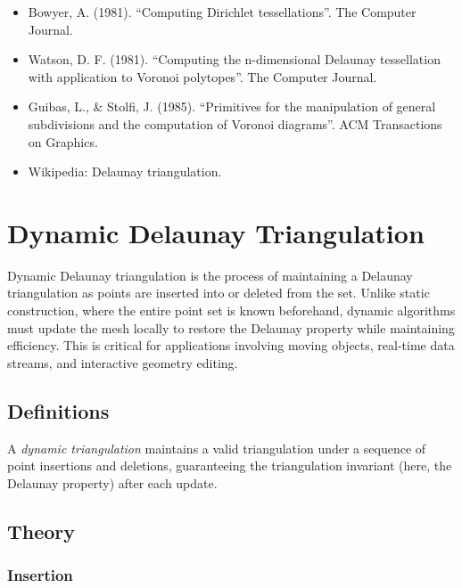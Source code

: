 \begin{itemize}
\item Bowyer, A. (1981). ``Computing Dirichlet tessellations''. The Computer Journal.
\item Watson, D. F. (1981). ``Computing the n-dimensional Delaunay tessellation with application to Voronoi polytopes''. The Computer Journal.
\item Guibas, L., \& Stolfi, J. (1985). ``Primitives for the manipulation of general subdivisions and the computation of Voronoi diagrams''. ACM Transactions on Graphics.
\item Wikipedia: Delaunay triangulation.
\end{itemize}


\section{Dynamic Delaunay Triangulation}
\label{sec:dynamic_delaunay}

Dynamic Delaunay triangulation is the process of maintaining a Delaunay triangulation as points are inserted into or deleted from the set. Unlike static construction, where the entire point set is known beforehand, dynamic algorithms must update the mesh locally to restore the Delaunay property while maintaining efficiency. This is critical for applications involving moving objects, real-time data streams, and interactive geometry editing.

\subsection{Definitions}

\begin{definition}\label{def:dynamic_triangulation}
A \emph{dynamic triangulation} maintains a valid triangulation under a sequence of point insertions and deletions, guaranteeing the triangulation invariant (here, the Delaunay property) after each update.
\end{definition}

\subsection{Theory}

\subsubsection*{Insertion}

